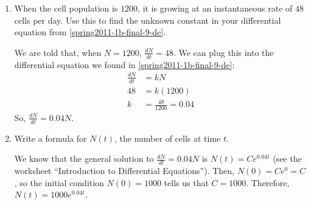 \documentclass{article}
\begin{document}
\begin{enumerate}
\begin{enumerate}
    \begin{problemonly}
      \textbf{Differential equation:}

      \pspace{0.15in}

      \textbf{Initial condition:}

      \pspace{0.15in}
    \end{problemonly}

    \begin{solution}
      We are told that the rate of population growth ($\frac{dN}{dt}$) is
      proportional to the population size ($N$), so $\boxed{\frac{dN}{dt}
        = k N}$ where $k$ is a constant.  We also have the initial
      condition $\boxed{N(0) = 1000}$.
    \end{solution}

  \item
    \begin{problem}[\vfill]
      When the cell population is $1200$, it is growing at an
      instantaneous rate of $48$ cells per day.  Use this to find the
      unknown constant in your differential equation from
      \ref{spring2011-1b-final-9-de}. 
    \end{problem}

    \begin{solution}
      We are told that, when $N = 1200$, $\frac{dN}{dt} = 48$.  We can
      plug this into the differential equation we found in
      \ref{spring2011-1b-final-9-de}:
      \begin{align*}
        \frac{dN}{dt} &= kN \\
        48 &= k (1200) \\
        k &= \frac{48}{1200} = 0.04
      \end{align*}
      So, $\boxed{\frac{dN}{dt} = 0.04 N}$. 
    \end{solution}

  \item
    \begin{problem}[\vfill]
      Write a formula for $N(t)$, the number of cells at time $t$. 
    \end{problem}

    \begin{solution}
      We know that the general solution to $\frac{dN}{dt} = 0.04 N$ is
      $N(t) = C e^{0.04 t}$ (see {the worksheet ``Introduction to Differential Equations''}).
      Then, $N(0) = C e^0 = C$, so the initial condition $N(0) = 1000$
      tells us that $C = 1000$.  Therefore, $\boxed{N(t) = 1000 e^{0.04
          t}}$.


\end{solution}
\end{enumerate}
\end{enumerate}
\end{document}
